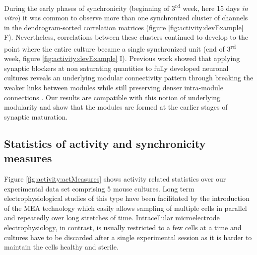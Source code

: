     During the early phases of synchronicity (beginning of 3\textsuperscript{rd} week, here 15 days \textit{in vitro}) it was common to observe more than one synchronized cluster of channels in the dendrogram-sorted correlation matrices (figure \ref{fig:activity:devExample} F). Nevertheless, correlations between these clusters continued to develop to the point where the entire culture became a single synchronized unit (end of 3\textsuperscript{rd} week, figure \ref{fig:activity:devExample} I). Previous work showed that applying synaptic blockers at non saturating quantities to fully developed neuronal cultures reveals an underlying modular connectivity pattern through breaking the weaker links between modules while still preserving denser intra-module connections \cite{breskin2006percolation}. Our results are compatible with this notion of underlying modularity and show that the modules are formed at the earlier stages of synaptic maturation.


        \subsection{Statistics of activity and synchronicity measures}
        \label{sec:activity:activityStats}

        Figure \ref{fig:activity:actMeasures} shows activity related statistics over our experimental data set comprising 5 mouse cultures. Long term electrophysiological studies of this type have been facilitated by the introduction of the MEA technology which easily allows sampling of multiple cells in parallel and repeatedly over long stretches of time. Intracellular microelectrode electrophysiology, in contrast, is usually restricted to a few cells at a time and cultures have to be discarded after a single experimental session as it is harder to maintain the cells healthy and sterile.

